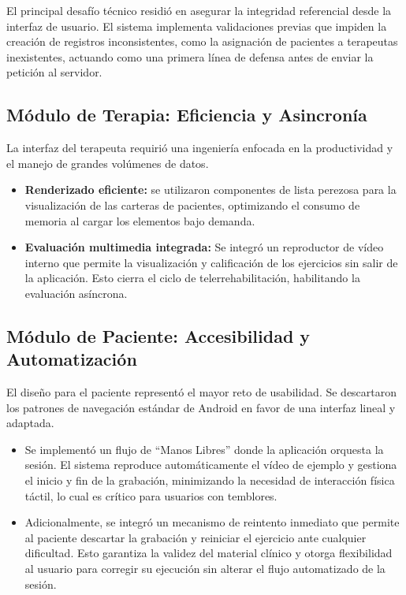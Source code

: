El principal desafío técnico residió en asegurar la integridad referencial desde la interfaz de usuario. El sistema implementa validaciones previas que impiden la creación de registros inconsistentes, como la asignación de pacientes a terapeutas inexistentes, actuando como una primera línea de defensa antes de enviar la petición al servidor.

\subsection{Módulo de Terapia: Eficiencia y Asincronía}

La interfaz del terapeuta requirió una ingeniería enfocada en la productividad y el manejo de grandes volúmenes de datos.

\begin{itemize}
    \item \textbf{Renderizado eficiente:} se utilizaron componentes de lista perezosa para la visualización de las carteras de pacientes, optimizando el consumo de memoria al cargar los elementos bajo demanda.
    \item \textbf{Evaluación multimedia integrada:} Se integró un reproductor de vídeo interno que permite la visualización y calificación de los ejercicios sin salir de la aplicación. Esto cierra el ciclo de telerrehabilitación, habilitando la evaluación asíncrona.
\end{itemize}

\subsection{Módulo de Paciente: Accesibilidad y Automatización}

El diseño para el paciente representó el mayor reto de usabilidad. Se descartaron los patrones de navegación estándar de Android en favor de una interfaz lineal y adaptada.

\begin{itemize}
    \item Se implementó un flujo de ``Manos Libres'' donde la aplicación orquesta la sesión. El sistema reproduce automáticamente el vídeo de ejemplo y gestiona el inicio y fin de la grabación, minimizando la necesidad de interacción física táctil, lo cual es crítico para usuarios con temblores.
    \item Adicionalmente, se integró un mecanismo de reintento inmediato que permite al paciente descartar la grabación y reiniciar el ejercicio ante cualquier dificultad. Esto garantiza la validez del material clínico y otorga flexibilidad al usuario para corregir su ejecución sin alterar el flujo automatizado de la sesión.
\end{itemize}

